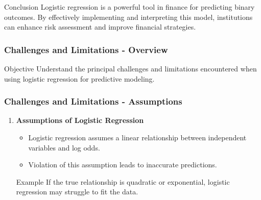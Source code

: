 \documentclass[aspectratio=169]{beamer}
\begin{document}
\begin{frame}[fragile]{Conclusion}
  Logistic regression is a powerful tool in finance for predicting binary outcomes. 
  By effectively implementing and interpreting this model, institutions can enhance risk assessment and improve financial strategies.
\end{frame}

\begin{frame}[fragile]
    \frametitle{Challenges and Limitations - Overview}
    \begin{block}{Objective}
        Understand the principal challenges and limitations encountered when using logistic regression for predictive modeling.
    \end{block}
\end{frame}

\begin{frame}[fragile]
    \frametitle{Challenges and Limitations - Assumptions}
    \begin{enumerate}
        \item \textbf{Assumptions of Logistic Regression}
        \begin{itemize}
            \item Logistic regression assumes a linear relationship between independent variables and log odds.
            \item Violation of this assumption leads to inaccurate predictions.
        \end{itemize}
        \begin{block}{Example}
            If the true relationship is quadratic or exponential, logistic regression may struggle to fit the data.
        \end{block}
    \end{enumerate}
\end{frame}
\end{document}
